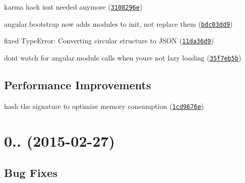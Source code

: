 \begin{DoxyItemize}
\item karma hack isn\textquotesingle{}t needed anymore (\href{https://github.com/ocombe/ocLazyLoad/commit/3108296e9d78da822e58333f2f7d674531ae937b}{\tt 3108296e})
\item angular.\+bootstrap now adds modules to init, not replace them (\href{https://github.com/ocombe/ocLazyLoad/commit/bdc03dd9128eca7fca2421317b9f7b103c9b419c}{\tt bdc03dd9})
\item fixed Type\+Error\+: Converting circular structure to J\+S\+ON (\href{https://github.com/ocombe/ocLazyLoad/commit/11da36d90bc5bae588fa3770430d371d5f935aae}{\tt 11da36d9})
\item don\textquotesingle{}t watch for angular.\+module calls when you\textquotesingle{}re not lazy loading (\href{https://github.com/ocombe/ocLazyLoad/commit/35f7eb5be57f7753a20d7460c5a380f44e3ac175}{\tt 35f7eb5b})
\end{DoxyItemize}

\subsection*{Performance Improvements}


\begin{DoxyItemize}
\item hash the signature to optimize memory consumption (\href{https://github.com/ocombe/ocLazyLoad/commit/1cd9676e8799cff03458f7d2d4d144f624da9cfa}{\tt 1cd9676e})
\end{DoxyItemize}

\label{_0.6.0}%
 \section*{0.. (2015-\/02-\/27)}

\subsection*{Bug Fixes}


